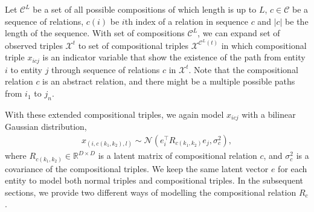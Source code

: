 Let $\mathcal{C}^{L}$ be a set of all possible compositions of which length is up to $L$, $c \in \mathcal{C}$ 
be a sequence of relations, $c(i)$ be $i$th index of a relation in sequence $c$ and $|c|$ be the length of the 
sequence. With set of compositions $\mathcal{C}^{L}$, we can expand set of observed triples 
$\mathcal{X}^{t}$ to set of compositional triples $\mathcal{X}^{\mathcal{C}^{L}(t)}$ in which 
compositional triple $x_{icj}$ is an 
indicator variable that show the existence of the path from entity $i$ to entity $j$ through sequence 
of relations 
$c$ in $\mathcal{X}^{t}$. Note that the compositional relation $c$ is an abstract relation, and there might be a 
multiple possible paths from $i_1$ to $j_n$.

With these extended compositional triples, we again model $x_{icj}$ with a bilinear Gaussian distribution,
\begin{align}
x_{(i, {{c}(k_1, k_2)}, l)} \sim \mathcal{N}(e_i^\top R_{{c}(k_1,k_2)} e_j, \sigma_{c}^2),
\end{align}
where $R_{{c}(k_1,k_2)} \in \mathbb{R}^{D\times D}$ is a latent matrix of compositional relation $c$, and $
\sigma_{c}^2$ is a covariance of the compositional triples. We keep the same latent vector $e$ for each entity 
to model both normal triples and compositional triples.
In the subsequent sections, we provide two different ways of modelling the compositional relation $R_c$.

